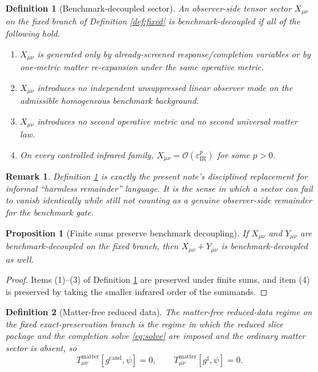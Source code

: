 \documentclass[11pt]{article}
\newcommand{\CandidateMetric}{g^{\mathrm{cand}}}
\newcommand{\CompletedMetric}{g^{\sharp}}
\newcommand{\epsIR}{\varepsilon_{\mathrm{IR}}}
\newtheorem{definition}{Definition}
\newtheorem{proposition}{Proposition}
\newtheorem{remark}{Remark}
\begin{document}
\begin{definition}[Benchmark-decoupled sector]
\label{def:benchdec}
An observer-side tensor sector \(X_{\mu\nu}\) on the fixed branch of Definition \ref{def:fixed} is \emph{benchmark-decoupled} if all of the following hold.
\begin{enumerate}
    \item \(X_{\mu\nu}\) is generated only by already-screened response/completion variables or by one-metric matter re-expansion under the same operative metric.
    \item \(X_{\mu\nu}\) introduces no independent unsuppressed linear observer mode on the admissible homogeneous benchmark background.
    \item \(X_{\mu\nu}\) introduces no second operative metric and no second universal matter law.
    \item On every controlled infrared family, \(X_{\mu\nu}=\mathcal O(\epsIR^p)\) for some \(p>0\).
\end{enumerate}
\end{definition}

\begin{remark}
Definition \ref{def:benchdec} is exactly the present note's disciplined replacement for informal ``harmless remainder'' language. It is the sense in which a sector can fail to vanish identically while still not counting as a genuine observer-side remainder for the benchmark gate.
\end{remark}

\begin{proposition}[Finite sums preserve benchmark decoupling]
\label{prop:sum}
If \(X_{\mu\nu}\) and \(Y_{\mu\nu}\) are benchmark-decoupled on the fixed branch, then \(X_{\mu\nu}+Y_{\mu\nu}\) is benchmark-decoupled as well.
\end{proposition}

\begin{proof}
Items (1)--(3) of Definition \ref{def:benchdec} are preserved under finite sums, and item (4) is preserved by taking the smaller infrared order of the summands.
\end{proof}

\begin{definition}[Matter-free reduced data]
\label{def:matterfree}
The \emph{matter-free reduced-data regime} on the fixed exact-preservation branch is the regime in which the reduced slice package and the completion solve \eqref{eq:solve} are imposed and the ordinary matter sector is absent, so
\begin{equation}
T_{\mu\nu}^{\mathrm{matter}}[\CandidateMetric,\psi]=0,
\qquad
T_{\mu\nu}^{\mathrm{matter}}[\CompletedMetric,\psi]=0.
\label{eq:matterfree}
\end{equation}
\end{definition}
\end{document}
